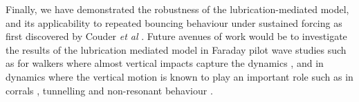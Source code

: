  Finally, we have demonstrated the robustness of the lubrication-mediated model, and its applicability to repeated bouncing behaviour under sustained forcing as first discovered  by Couder \textit{et al} \cite{couder2005walking}. Future avenues of work  would be to investigate the results of the lubrication mediated model in Faraday pilot wave studies such as for walkers where almost vertical impacts capture the dynamics \cite{galeano2017non}, and in dynamics where the vertical motion is known to play an important role such as in corrals \cite{durey2020faraday}, tunnelling \cite{nachbin2017tunneling} and non-resonant behaviour \cite{primkulov2025nonresonant}. 

